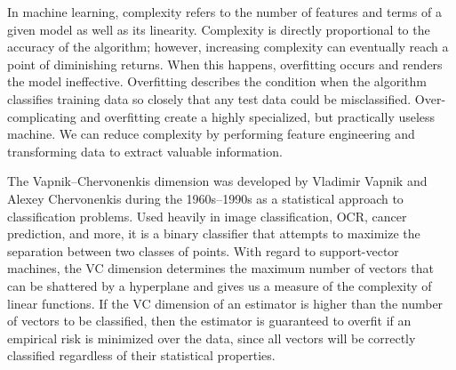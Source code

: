 \documentclass[11pt]{article}
\begin{document}
\begin{tcolorbox}[colback=CrispBlue!5!white,colframe=CrispBlue!75!black,title=2. Explain the concepts of complexity and overfitting.]
In machine learning, complexity refers to the number of features and terms of a given model as well as its linearity. Complexity is directly proportional to the accuracy of the algorithm; however, increasing complexity can eventually reach a point of diminishing returns. When this happens, overfitting occurs and renders the model ineffective. Overfitting describes the condition when the algorithm classifies training data so closely that any test data could be misclassified. Over-complicating and overfitting create a highly specialized, but practically useless machine. We can reduce complexity by performing feature engineering and transforming data to extract valuable information.
\end{tcolorbox}

\begin{tcolorbox}[colback=CrispBlue!5!white,colframe=CrispBlue!75!black,title=3. Introduce the concept of VC dimension.]
The Vapnik–Chervonenkis dimension was developed by Vladimir Vapnik and Alexey Chervonenkis during the 1960s--1990s as a statistical approach to classification problems. Used heavily in image classification, OCR, cancer prediction, and more, it is a binary classifier that attempts to maximize the separation between two classes of points. With regard to support-vector machines, the VC dimension determines the maximum number of vectors that can be shattered by a hyperplane and gives us a measure of the complexity of linear functions. If the VC dimension of an estimator is higher than the number of vectors to be classified, then the estimator is guaranteed to overfit if an empirical risk is minimized over the data, since all vectors will be correctly classified regardless of their statistical properties.
\end{tcolorbox}
\end{document}
